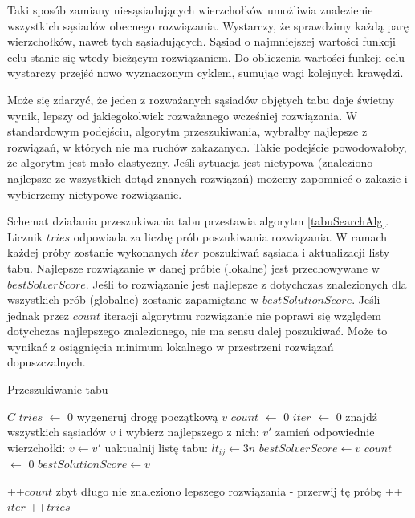 \documentclass[11pt,a4paper,twoside]{article}
\begin{document}
Taki sposób zamiany niesąsiadujących wierzchołków umożliwia znalezienie wszystkich sąsiadów obecnego rozwiązania. Wystarczy, że sprawdzimy każdą parę wierzchołków, nawet tych sąsiadujących. Sąsiad o najmniejszej wartości funkcji celu stanie się wtedy bieżącym rozwiązaniem. Do obliczenia wartości funkcji celu wystarczy przejść nowo wyznaczonym cyklem, sumując wagi kolejnych krawędzi.

Może się zdarzyć, że jeden z rozważanych sąsiadów objętych tabu daje świetny wynik, lepszy od jakiegokolwiek rozważanego wcześniej rozwiązania. W standardowym podejściu, algorytm przeszukiwania, wybrałby najlepsze z rozwiązań, w których nie ma ruchów zakazanych. Takie podejście powodowałoby, że algorytm jest mało elastyczny. Jeśli sytuacja jest nietypowa (znaleziono najlepsze ze wszystkich dotąd znanych rozwiązań) możemy zapomnieć o zakazie i wybierzemy nietypowe rozwiązanie. 

Schemat działania przeszukiwania tabu przestawia algorytm \ref{tabuSearchAlg}. Licznik $tries$ odpowiada za liczbę prób poszukiwania rozwiązania. W ramach każdej próby zostanie wykonanych $iter$ poszukiwań sąsiada i aktualizacji listy tabu. Najlepsze rozwiązanie w danej próbie (lokalne) jest przechowywane w $bestSolverScore$. Jeśli to rozwiązanie jest najlepsze z dotychczas znalezionych dla wszystkich prób (globalne) zostanie zapamiętane w $bestSolutionScore$. Jeśli jednak przez $count$ iteracji algorytmu rozwiązanie nie poprawi się względem dotychczas najlepszego znalezionego, nie ma sensu dalej poszukiwać. Może to wynikać z osiągnięcia minimum lokalnego w przestrzeni rozwiązań dopuszczalnych.

\begin{algorithm}[ht]
\caption{Przeszukiwanie tabu}
\label{tabuSearchAlg}
\begin{algorithmic}%
\Require $C$
	\State $tries$ $\leftarrow$ 0
		\State wygeneruj drogę początkową $v$
		\State $count$ $\leftarrow$ 0
		\State $iter$ $\leftarrow$ 0
			\State znajdź wszystkich sąsiadów $v$ i wybierz najlepszego z nich: $v'$
			\State zamień odpowiednie wierzchołki: $v \leftarrow v'$ 
			\State uaktualnij listę tabu: $lt_{ij} \leftarrow 3n$
				\State $bestSolverScore \leftarrow v$
				\State $count$ $\leftarrow$ 0
					\State $bestSolutionScore \leftarrow v$
					
    			\EndIf
    		
    		\Else
    			\State ++$count$
    		\EndIf
    			\State zbyt długo nie znaleziono lepszego rozwiązania - przerwij tę próbę
    		\EndIf
    	\State ++$iter$
		\EndWhile
		\State ++$tries$
	\EndWhile
\end{algorithmic}
\end{algorithm}
\end{document}
